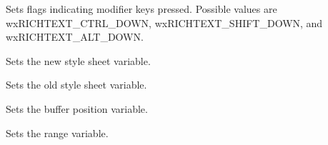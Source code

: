 Sets flags indicating modifier keys pressed. Possible values are wxRICHTEXT\_CTRL\_DOWN,
wxRICHTEXT\_SHIFT\_DOWN, and wxRICHTEXT\_ALT\_DOWN.

\label{wxrichtexteventsetnewstylesheet}


Sets the new style sheet variable.

\label{wxrichtexteventsetoldstylesheet}


Sets the old style sheet variable.

\label{wxrichtexteventsetposition}


Sets the buffer position variable.

\label{wxrichtexteventsetrange}


Sets the range variable.

